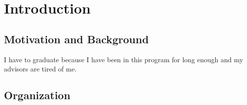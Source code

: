 \chapter{Introduction}
\label{ch1}
\section{Motivation and Background}


I have to graduate because I have been in this program for long enough and my advisors are tired of me.

\section{Organization}


